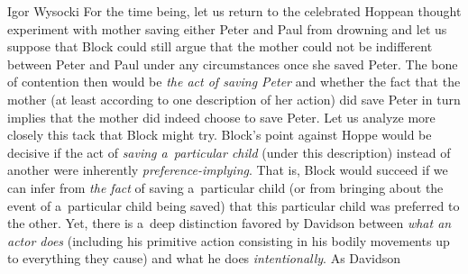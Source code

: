 \begin{artengenv}{Igor Wysocki}
For the time being, let us return to the celebrated Hoppean thought experiment with mother saving either Peter and Paul from drowning and let us suppose that Block could still argue that the mother could not be indifferent between Peter and Paul under any circumstances once she saved Peter. The bone of contention then would be \textit{the act of saving Peter} and whether the fact that the mother (at least according to one description of her action) did save Peter in turn implies that the mother did indeed choose to save Peter. Let us analyze more closely this tack that Block might try. Block's point against Hoppe would be decisive if the act of \textit{saving a~particular child} (under this description) instead of another were inherently \textit{preference-implying}. That is, Block would succeed if we can infer from \textit{the fact} of saving a~particular child (or from bringing about the event of a~particular child being saved) that this particular child was preferred to the other. Yet, there is a~deep distinction favored by Davidson
\parencite*[][]{davidson_agency_2001} %
 between \textit{what an actor does} (including his primitive action consisting in his bodily movements up to everything they cause) and what he does \textit{intentionally}. As Davidson 
\parencite*[][p.45]{davidson_agency_2001} %

\end{artengenv}

